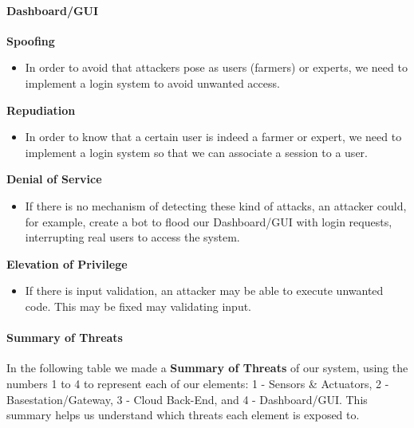 \paragraph{Dashboard/GUI}\mbox{}

\textbf{Spoofing}

\begin{itemize}
    \item In order to avoid that attackers pose as users (farmers) or experts, we need to implement a login system to avoid unwanted access.
\end{itemize}

\textbf{Repudiation}

\begin{itemize}
    \item In order to know that a certain user is indeed a farmer or expert, we need to implement a login system so that we can associate a session to a user.
\end{itemize}

\textbf{Denial of Service}

\begin{itemize}
    \item If there is no mechanism of detecting these kind of attacks, an attacker could, for example, create a bot to flood our Dashboard/GUI with login requests, interrupting real users to access the system.
\end{itemize}

\textbf{Elevation of Privilege}

\begin{itemize}
    \item If there is input validation, an attacker may be able to execute unwanted code. This may be fixed may validating input.
\end{itemize}


\paragraph{Summary of Threats}\mbox{}

In the following table we made a \textbf{Summary of Threats} of our system, using the numbers 1 to 4 to represent each of our elements: 1 - Sensors \& Actuators, 2 - Basestation/Gateway, 3 - Cloud Back-End, and 4 - Dashboard/GUI. This summary helps us understand which threats each element is exposed to.

